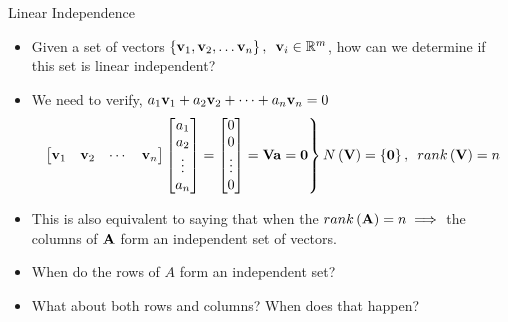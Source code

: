 \documentclass[aspectratio=169]{beamer}
\def\mf{\ensuremath\mathbf}
\begin{document}
\begin{frame}[t]{Linear Independence}
\begin{itemize}
    \item Given a set of vectors $\left\{\mf{v}_1, \mf{v}_2, \ldots \mf{v}_n\right\}, \,\,\, \mf{v}_i \in \mathbb{R}^m$, how can we determine if this set is linear independent?
    \item We need to verify, $a_1 \mf{v}_1 + a_2 \mf{v}_2 + \cdots + a_n \mf{v}_n= 0$
    \[ \begin{rcases*}\begin{bmatrix} \mf{v}_1 & \mf{v}_2 & \cdots & \mf{v}_n\end{bmatrix} \begin{bmatrix} a_1 \\ a_2 \\ \vdots \\ a_n\end{bmatrix} = \begin{bmatrix} 0 \\ 0 \\ \vdots \\ 0\end{bmatrix} = \mf{V}\mf{a} = \mf{0}\end{rcases*} N\left(\mf{V}\right) = \left\{\mf{0}\right\}, \,\,\, rank\left(\mf{V}\right) = n  \]
    \item This is also equivalent to saying that when the $rank \left(\mf{A}\right) = n \implies$ the columns of $\mf{A}$ form an independent set of vectors.
    \item When do the rows of $A$ form an independent set?
    \item What about both rows and columns? When does that happen?
\end{itemize}
\end{frame}
\end{document}
